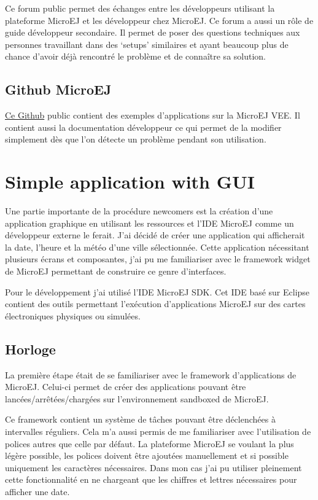 \documentclass[french,a4paper,12pt]{report}
\begin{document}
Ce forum public permet des échanges entre les développeurs utilisant la plateforme MicroEJ et les développeur chez MicroEJ. Ce forum a aussi un rôle de guide développeur secondaire. Il permet de poser des questions techniques aux personnes travaillant dans des ‘setups’ similaires et ayant beaucoup plus de chance d’avoir déjà rencontré le problème et de connaître sa solution.

\subsection{Github MicroEJ}

\href{https://github.com/MicroEJ}{Ce Github} public contient des exemples d’applications sur la MicroEJ VEE. Il contient aussi la documentation développeur ce qui permet de la modifier simplement dès que l'on détecte un problème pendant son utilisation.

\section{Simple application with GUI}

Une partie importante de la procédure newcomers est la création d'une application graphique en utilisant les ressources et l'IDE MicroEJ comme un développeur externe le ferait. 
J'ai décidé de créer une application qui afficherait la date, l'heure et la météo d'une ville sélectionnée. Cette application nécessitant plusieurs écrans et composantes, j'ai pu me familiariser avec le framework widget de MicroEJ permettant de construire ce genre d'interfaces.

Pour le développement j'ai utilisé l'IDE MicroEJ SDK. Cet IDE basé sur Eclipse contient des outils permettant l’exécution d'applications MicroEJ sur des cartes électroniques physiques ou simulées.

\subsection{Horloge}

La première étape était de se familiariser avec le framework d’applications de MicroEJ. Celui-ci permet de créer des applications pouvant être lancées/arrêtées/chargées sur l’environnement sandboxed de MicroEJ. 

Ce framework contient un système de tâches pouvant être déclenchées à intervalles réguliers.
Cela m’a aussi permis de me familiariser avec l’utilisation de polices autres que celle par défaut. La plateforme MicroEJ se voulant la plus légère possible, les polices doivent être ajoutées manuellement et si possible uniquement les caractères nécessaires. Dans mon cas j’ai pu utiliser pleinement cette fonctionnalité en ne chargeant que les chiffres et lettres nécessaires pour afficher une date. 
\end{document}
